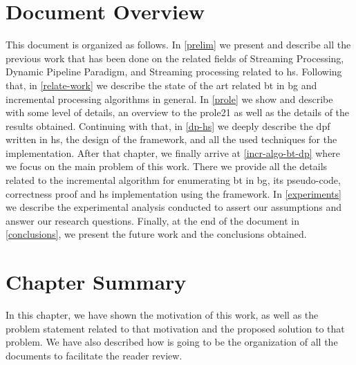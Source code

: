 \section{Document Overview}
This document is organized as follows. In \autoref{prelim} we present and describe all the previous work that has been done on the related fields of Streaming Processing, Dynamic Pipeline Paradigm, and Streaming processing related to \acrshort{hs}. 
Following that, in \autoref{relate-work} we describe the state of the art related \acrshort{bt} in \acrshort{bg} and incremental processing algorithms in general.
In \autoref{prole} we show and describe with some level of details, an overview to the \acrshort{prole21} as well as the details of the results obtained. 
Continuing with that, in \autoref{dp-hs} we deeply describe the \acrshort{dpf} written in \acrshort{hs}, the design of the framework, and all the used techniques for the implementation.
After that chapter, we finally arrive at \autoref{incr-algo-bt-dp} where we focus on the main problem of this work. There we provide all the details related to the incremental algorithm for enumerating \acrshort{bt} in \acrshort{bg}, its pseudo-code,
correctness proof and \acrshort{hs} implementation using the framework.
In \autoref{experiments} we describe the experimental analysis conducted to assert our assumptions and answer our research questions.
Finally, at the end of the document in \autoref{conclusions}, we present the future work and the conclusions obtained.

\section{Chapter Summary}
In this chapter, we have shown the motivation of this work, as well as the problem statement related to that motivation and the proposed solution to that problem.
We have also described how is going to be the organization of all the documents to facilitate the reader review.
